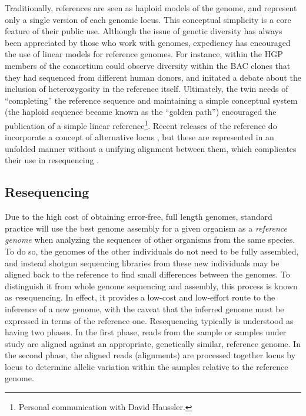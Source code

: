 Traditionally, references are seen as haploid models of the genome, and represent only a single version of each genomic locus.
This conceptual simplicity is a core feature of their public use.
Although the issue of genetic diversity has always been appreciated by those who work with genomes, expediency has encouraged the use of linear models for reference genomes.
For instance, within the HGP members of the consortium could observe diversity within the BAC clones that they had sequenced from different human donors, and initated a debate about the inclusion of heterozygosity in the reference itself.
Ultimately, the twin needs of ``completing'' the reference sequence and maintaining a simple conceptual system (the haploid sequence became known as the ``golden path'') encouraged the publication of a simple linear reference\footnote{Personal communication with David Haussler.}.
Recent releases of the reference do incorporate a concept of alternative locus \cite{schneider2017evaluation}, but these are represented in an unfolded manner without a unifying alignment between them, which complicates their use in resequencing \cite{jager2016alternate}.

\subsection{Resequencing}

Due to the high cost of obtaining error-free, full length genomes, standard practice will use the best genome assembly for a given organism as a \emph{reference genome} when analyzing the sequences of other organisms from the same species.
To do so, the genomes of the other individuals do not need to be fully assembled, and instead shotgun sequencing libraries from these new individuals may be aligned back to the reference to find small differences between the genomes.
To distinguish it from whole genome sequencing and assembly, this process is known as \emph{re}sequencing.
In effect, it provides a low-cost and low-effort route to the inference of a new genome, with the caveat that the inferred genome must be expressed in terms of the reference one.
Resequencing typically is understood as having two phases.
In the first phase, reads from the sample or samples under study are aligned against an appropriate, genetically similar, reference genome.
In the second phase, the aligned reads (alignments) are processed together locus by locus to determine allelic variation within the samples relative to the reference genome.

